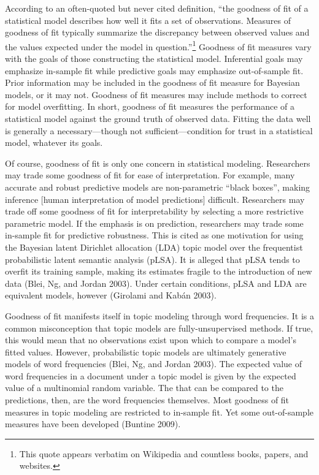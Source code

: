 \documentclass[conference,final,]{IEEEtran}
\begin{document}
According to an often-quoted but never cited definition, ``the goodness
of fit of a statistical model describes how well it fits a set of
observations. Measures of goodness of fit typically summarize the
discrepancy between observed values and the values expected under the
model in question.''\footnote{This quote appears verbatim on Wikipedia
  and countless books, papers, and websites.} Goodness of fit measures
vary with the goals of those constructing the statistical model.
Inferential goals may emphasize in-sample fit while predictive goals may
emphasize out-of-sample fit. Prior information may be included in the
goodness of fit measure for Bayesian models, or it may not. Goodness of
fit measures may include methods to correct for model overfitting. In
short, goodness of fit measures the performance of a statistical model
against the ground truth of observed data. Fitting the data well is
generally a necessary---though not sufficient---condition for trust in a
statistical model, whatever its goals.

Of course, goodness of fit is only one concern in statistical modeling.
Researchers may trade some goodness of fit for ease of interpretation.
For example, many accurate and robust predictive models are
non-parametric ``black boxes'', making inference {[}human interpretation
of model predictions{]} difficult. Researchers may trade off some
goodness of fit for interpretability by selecting a more restrictive
parametric model. If the emphasis is on prediction, researchers may
trade some in-sample fit for predictive robustness. This is cited as one
motivation for using the Bayesian latent Dirichlet allocation (LDA)
topic model over the frequentist probabilistic latent semantic analysis
(pLSA). It is alleged that pLSA tends to overfit its training sample,
making its estimates fragile to the introduction of new data (Blei, Ng,
and Jordan 2003). Under certain conditions, pLSA and LDA are equivalent
models, however (Girolami and Kabán 2003).

Goodness of fit manifests itself in topic modeling through word
frequencies. It is a common misconception that topic models are
fully-unsupervised methods. If true, this would mean that no
observations exist upon which to compare a model's fitted values.
However, probabilistic topic models are ultimately generative models of
word frequencies (Blei, Ng, and Jordan 2003). The expected value of word
frequencies in a document under a topic model is given by the expected
value of a multinomial random variable. The that can be compared to the
predictions, then, are the word frequencies themselves. Most goodness of
fit measures in topic modeling are restricted to in-sample fit. Yet some
out-of-sample measures have been developed (Buntine 2009).
\end{document}
